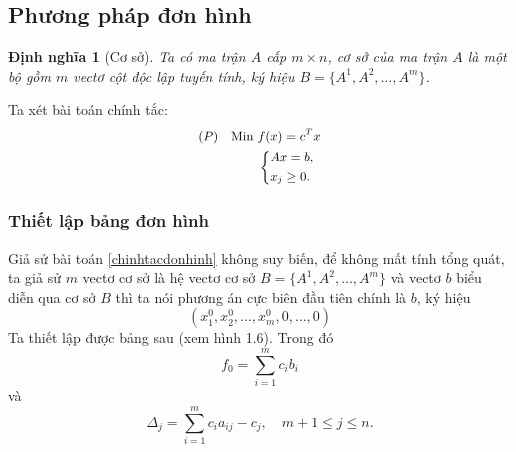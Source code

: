 \documentclass[12pt,a4paper]{report}
\newtheorem{dn}{Định nghĩa}
\begin{document}
\subsection{Phương pháp đơn hình}
\begin{dn}[Cơ sở]
    Ta có ma trận $A$ cấp $m \times n$, cơ sở của ma trận $A$ là một bộ gồm $m$ vectơ cột độc lập tuyến tính, ký hiệu $B=\{A^1, A^2, \ldots , A^m\}$.
\end{dn}



Ta xét bài toán chính tắc:
    \begin{equation} \small \label{chinhtacdonhinh}
        \begin{split}
        (P) \quad \text{Min } & f(x) = c^Tx \\
            & \left\{
            \begin{split}
            & Ax=b, \\
            & x_j \geq 0.
            \end{split}
            \right.    
        \end{split}
    \end{equation}

\subsubsection*{Thiết lập bảng đơn hình}
Giả sử bài toán \eqref{chinhtacdonhinh} không suy biến, để không mất tính tổng quát, ta giả sử $m$ vectơ cơ sở là hệ vectơ cơ sở $B=\{A^1, A^2, \ldots , A^m\}$ và vectơ $b$ biểu diễn qua cơ sở $B$ thì ta nói phương án cực biên đầu tiên chính là $b$, ký hiệu
\begin{equation}
(x_1^0,x_2^0,\ldots,x_m^0,0,\ldots,0)
\end{equation}
Ta thiết lập được bảng sau (xem hình 1.6). Trong đó
\begin{equation}
    f_0 = \sum_{i=1}^m c_ib_i
\end{equation}
và
\begin{equation}
    \Delta _j= \sum_{i=1}^m c_ia_{ij}-c_j, \quad m+1\leq j \leq n .
\end{equation}
\end{document}
